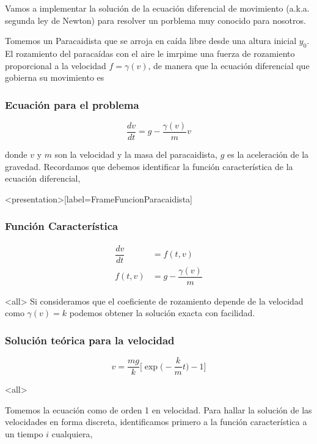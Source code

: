 
Vamos a implementar la solución de la ecuación diferencial de movimiento 
(a.k.a. segunda ley de Newton) para resolver un porblema muy conocido para 
nosotros. 

Tomemos un Paracaidista que se arroja en caída libre desde una altura inicial $y_0$.
El rozamiento del paracaídas con el aire le imrpime una fuerza de rozamiento proporcional 
a la velocidad $f = \gamma (v)$, de manera que la ecuación diferencial que gobierna su movimiento es

\mode*

\begin{frame}[label=FrameEcuacionParacaidista]
  \frametitle<presentation>{Ecuación para el problema}
  \begin{equation}\label{EqnNewtonParac}
    \dfrac{ d v }{dt} = g - \dfrac{\gamma (v)}{m} v
  \end{equation}
\end{frame}

donde $v$ y $m$ son la velocidad y la masa del paracaidista, $g$ es la aceleración de la gravedad.
Recordamos que debemos identificar la función característica de la ecuación diferencial, 

\mode*
\begin{frame}<presentation>[label=FrameFuncionParacaidista]
  \frametitle{Función Característica}
  \begin{equation}
    \begin{aligned}
      \dfrac{d v}{d t} &= f(t, v) \\
      f(t, v) &= g - \dfrac{\gamma (v)}{m}
    \end{aligned}
  \end{equation}
\end{frame}

\mode<all>
Si consideramos que el coeficiente de rozamiento depende de la velocidad como $\gamma (v) = k $
podemos obtener la solución exacta con facilidad.

\mode*
\begin{frame}[label=FrameSolucionTeorica]
  \frametitle<presentation>{Solución teórica para la velocidad}
  \begin{equation}
    v = \frac{m g}{k} \Big[ \exp\Big( - \frac{k}{m} t \Big) -1 \Big]
  \end{equation}
\end{frame}

\mode<all>

Tomemos la ecuación como de orden 1 en velocidad. 
Para hallar la solución de las velocidades en forma discreta, 
identificamos primero a la función característica a un tiempo $i$ cualquiera,


